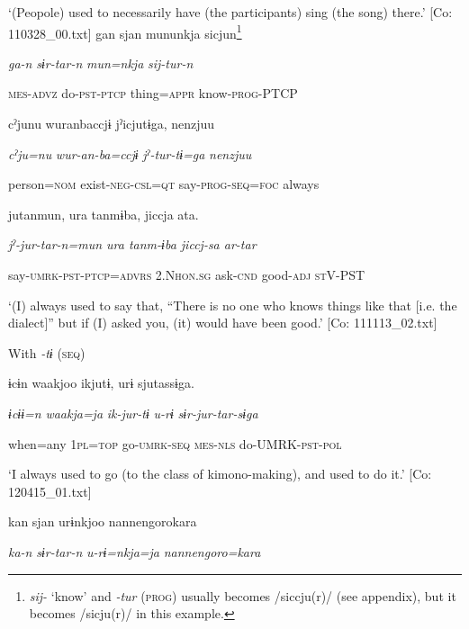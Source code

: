 \glt ‘(Peopole) used to necessarily have (the participants) sing (the song) there.’ [Co: 110328\_00.txt]
\ex {\TM}
\glll  gan  sjan  mununkja  sicjun\footnote{\textit{sij-} ‘know’ and \textit{{}-tur} (\textsc{prog}) usually becomes /siccju(r)/ (see appendix), but it becomes /sicju(r)/ in this example.}

      \textit{ga-n}  \textit{sɨr-tar-n}  \textit{mun=nkja}  \textit{sij-tur-n}

      \textsc{mes}-\textsc{advz}  do-\textsc{pst}-\textsc{ptcp}  thing=\textsc{appr}  know-\textsc{prog}-PTCP

      cˀjunu  wuranbaccjɨ  jˀicjutɨga,  {\textbar}nenzjuu{\textbar}

      \textit{cˀju=nu}  \textit{wur-an-ba=ccjɨ}  \textit{jˀ-tur-tɨ=ga}  \textit{nenzjuu}

      person=\textsc{nom}  exist-\textsc{neg}-\textsc{csl}=\textsc{qt}  say-\textsc{prog}-\textsc{seq}=\textsc{foc}  always

      jutanmun,  ura  tanmɨba,  jiccja  ata.

      \textit{jˀ-jur-tar{}-n=mun  ura  tanm-ɨba  jiccj-sa  ar-tar}

      say-\textsc{umrk}-\textsc{pst}-\textsc{ptcp}=\textsc{advrs}  2.N\textsc{hon}.\textsc{sg}  ask-\textsc{cnd}  good-\textsc{adj}  \textsc{st}V-PST

\glt ‘(I) always used to say that, “There is no one who knows things like that [i.e. the dialect]” but if (I) asked you, (it) would have been good.’ [Co: 111113\_02.txt]
\z

  With \textit{{}-tɨ} (\textsc{seq})

\ex {\TM}
\glll  ɨcɨn  waakjoo  ikjutɨ,  urɨ  sjutassɨga.

      \textit{ɨcɨɨ=n}  \textit{waakja=ja}  \textit{ik-jur-tɨ}  \textit{u-rɨ}  \textit{sɨr-jur-tar-sɨga}

      when=any  1\textsc{pl}=\textsc{top}  go-\textsc{umrk}-\textsc{seq}  \textsc{mes}-\textsc{nls}  do-UMRK-\textsc{pst}-\textsc{pol}

\glt ‘I always used to go (to the class of kimono-making), and used to do it.’ [Co: 120415\_01.txt]

    {\TM}
\glll  kan  sjan  urɨnkjoo  {\textbar}nannengoro{\textbar}kara

      \textit{ka-n}  \textit{sɨr-tar-n}  \textit{u-rɨ=nkja=ja}  \textit{nannengoro=kara}

